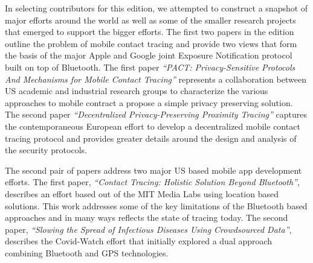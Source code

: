 \documentclass[11pt]{article}
\begin{document}
In selecting contributors for this edition, we attempted to construct a snapshot of major efforts around the world as well as some of the smaller research projects that emerged to support the bigger efforts. 
The first two papers in the edition outline the problem of mobile contact tracing and provide two views that form the basis of the major Apple and Google joint Exposure Notification protocol built on top of Bluetooth. 
The first paper \emph{``{PACT}:   Privacy-Sensitive Protocols And Mechanisms for Mobile Contact Tracing''} represents a collaboration between US academic and industrial research groups to characterize the various approaches to mobile contract a propose a simple privacy preserving solution. 
The second paper \emph{``Decentralized Privacy-Preserving Proximity Tracing''} captures the contemporaneous European effort to develop a decentralized mobile contact tracing protocol and provides greater details around the design and analysis of the security protocols.


The second pair of papers address two major US based mobile app development efforts.  The first paper, \emph{``Contact Tracing: Holistic Solution Beyond Bluetooth''}, describes an effort based out of the MIT Media Labs using location based solutions.  
This work addresses some of the key limitations of the Bluetooth based approaches and in many ways reflects the state of tracing today.  
The second paper, \emph{``Slowing the Spread of Infectious Diseases Using Crowdsourced Data''}, describes the Covid-Watch effort that initially explored a dual approach combining Bluetooth and GPS technologies. 














\end{document}
